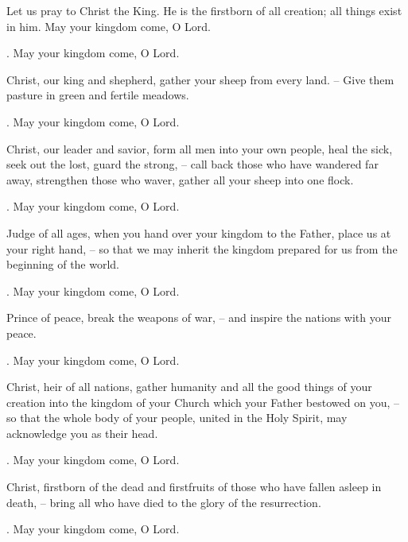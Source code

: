 \lettrine[loversize=0.15,lines=2]{L}{}et us pray to Christ the King. He is the firstborn of all creation; all things exist in him. May your kingdom come, O Lord.
\par \Rbar. May your kingdom come, O Lord.

Christ, our king and shepherd, gather your sheep from every land.
– Give them pasture in green and fertile meadows.
\par \Rbar. May your kingdom come, O Lord.

Christ, our leader and savior, form all men into your own people, heal the sick, seek out the lost, guard the strong,
– call back those who have wandered far away, strengthen those who waver, gather all your sheep into one flock.
\par \Rbar. May your kingdom come, O Lord.

Judge of all ages, when you hand over your kingdom to the Father, place us at your right hand,
– so that we may inherit the kingdom prepared for us from the beginning of the world.
\par \Rbar. May your kingdom come, O Lord.

Prince of peace, break the weapons of war,
– and inspire the nations with your peace.
\par \Rbar. May your kingdom come, O Lord.

Christ, heir of all nations, gather humanity and all the good things of your creation into the kingdom of your Church which your Father bestowed on you,
– so that the whole body of your people, united in the Holy Spirit, may acknowledge you as their head.
\par \Rbar. May your kingdom come, O Lord.

Christ, firstborn of the dead and firstfruits of those who have fallen asleep in death,
– bring all who have died to the glory of the resurrection.
\par \Rbar. May your kingdom come, O Lord.